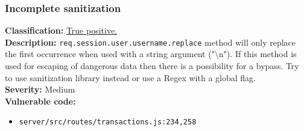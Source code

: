 \documentclass[]{article}
\begin{document}
\subsubsection{Incomplete sanitization}
\textbf{Classification:} \hyperref[subsubsec:improper_limitation_of_a_pathname_to_a_restricted_directory]{True positive.} \\ 
\textbf{Description:} \texttt{req.session.user.username.replace} method will only replace the first occurrence when used with a  
          string argument ("\textbackslash n"). If this method is used for escaping of dangerous data then there is a       
          possibility for a bypass. Try to use sanitization library instead or use a Regex with a global flag. \\ 
\textbf{Severity:} Medium \\ 
\textbf{Vulnerable code:}
\begin{itemize}
    \item \texttt{server/src/routes/transactions.js:234,258}
\end{itemize}
\end{document}
